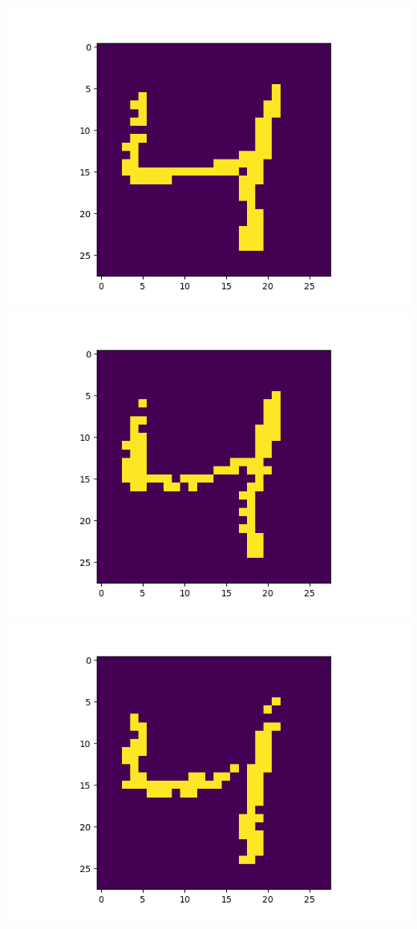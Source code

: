 \includegraphics[scale=0.2]{./bilder/comparison/prob/40}
\includegraphics[scale=0.2]{./bilder/comparison/prob/41}
\includegraphics[scale=0.2]{./bilder/comparison/prob/42}
